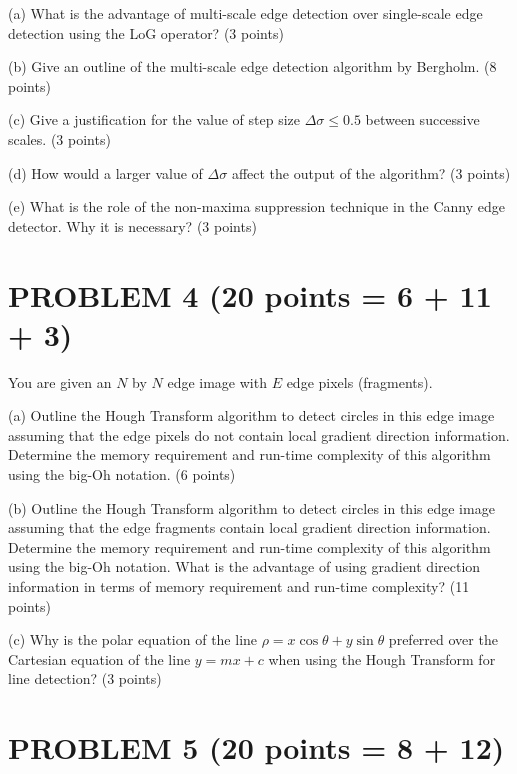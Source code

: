 \documentclass[11pt]{article}
\theoremstyle{definition}
\begin{document}
(a) What is the advantage of multi-scale edge detection over single-scale edge detection using the LoG operator? (3 points)

(b) Give an outline of the multi-scale edge detection algorithm by Bergholm. (8 points)

(c) Give a justification for the value of step size $\Delta\sigma \le 0.5$ between successive scales. (3 points)

(d) How would a larger value of $\Delta\sigma$ affect the output of the algorithm? (3 points)

(e) What is the role of the non-maxima suppression technique in the Canny edge detector. Why it is necessary? (3 points)

\vspace{1cm}

\section*{PROBLEM 4 (20 points = 6 + 11 + 3)}

You are given an $N$ by $N$ edge image with $E$ edge pixels (fragments).

(a) Outline the Hough Transform algorithm to detect circles in this edge image assuming that the edge pixels do not contain local gradient direction information. Determine the memory requirement and run-time complexity of this algorithm using the big-Oh notation. (6 points)

(b) Outline the Hough Transform algorithm to detect circles in this edge image assuming that the edge fragments contain local gradient direction information. Determine the memory requirement and run-time complexity of this algorithm using the big-Oh notation. What is the advantage of using gradient direction information in terms of memory requirement and run-time complexity? (11 points)

(c) Why is the polar equation of the line $\rho = x \cos \theta + y \sin \theta$ preferred over the Cartesian equation of the line $y = mx + c$ when using the Hough Transform for line detection? (3 points)

\newpage

\section*{PROBLEM 5 (20 points = 8 + 12)}
\end{document}
